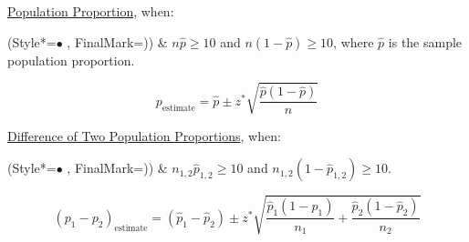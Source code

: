 \underline{Population Proportion}, when:
\begin{easylist}[itemize]
\ListProperties(Style*=$\bullet$ , FinalMark={)})
\vspace{-2.0mm}
& $n\hat{p}\geq10$ and $n(1-\hat{p})\geq10$, where $\hat{p}$ is the sample population proportion.
\end{easylist}
% 
\vspace{-5.0mm}
\begin{equation}
p_{\textrm{estimate}} = \hat{p} \pm z^{*} \sqrt{\frac{\hat{p}(1-\hat{p})}{n}}
\end{equation}

\underline{Difference of Two Population Proportions}, when:
\begin{easylist}[itemize]
\ListProperties(Style*=$\bullet$ , FinalMark={)})
\vspace{-2.0mm}
& $n_{1,2}\hat{p}_{1,2}\geq10$ and $n_{1,2}(1-\hat{p}_{1,2})\geq10$.
\end{easylist}
% 
\vspace{-5.0mm}
\begin{equation}
(p_1 - p_2)_{\textrm{estimate}} = (\hat{p}_1 - \hat{p}_2) \pm z^{*} \sqrt{\frac{\hat{p}_1(1-\hat{p}_1)}{n_1}+ \frac{\hat{p}_2(1-\hat{p}_2)}{n_2}}
\end{equation}

